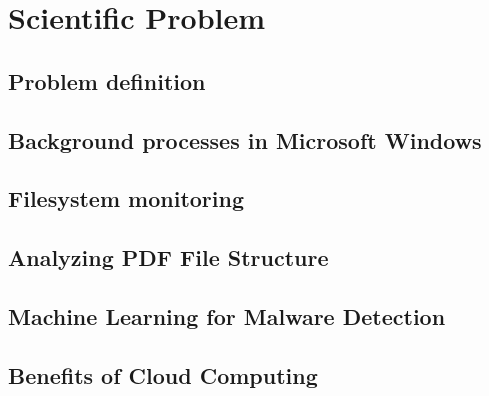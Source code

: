 \chapter{Scientific Problem}
\label{section:scientificProblem}


\section{Problem definition}
\label{section:problemDefinition}

\section{Background processes in Microsoft Windows}
\label{section:backgroundProc}

\section{Filesystem monitoring}
\label{section:filesystem}

\section{Analyzing PDF File Structure}
\label{section:pdfStructure}

\section{Machine Learning for Malware Detection}
\label{section:mlForMalware}

\section{Benefits of Cloud Computing}
\label{section:cloudComputing}
